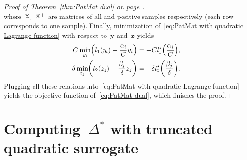 \begin{proof}[Proof of Theorem~\ref{thm:PatMat dual} on page~\pageref{thm:PatMat dual}]
\begin{equation*}
  \end{equation*}
  where~$\mathbb{X},$~$\mathbb{X}^+$ are matrices of all and positive samples respectively (each row corresponds to one sample). Finally, minimization of~\eqref{eq:PatMat with quadratic Lagrange function} with respect to~$\bm{y}$ and~$\bm{z}$ yields
  \begin{alignat*}{2}
      C \min_{y_i} \Brac{l_1(y_i) - \frac{\alpha_i}{C} y_i}
      & = - C l_1^{\star} \Brac{\frac{\alpha_i}{C}}, \\
      \delta \min_{z_j} \Brac{l_2(z_j) - \frac{\beta_j}{\delta} z_j}
      & = - \delta l_2^{\star} \Brac{\frac{\beta_j}{\delta}}.
  \end{alignat*}
  Plugging all these relations into~\eqref{eq:PatMat with quadratic Lagrange function} yields the objective function of~\eqref{eq:PatMat dual}, which finishes the proof.
\end{proof}

\section{Computing~$\Delta^{*}$ with truncated quadratic surrogate}\label{sec:Computing Delta with truncated quadratic surrogate}

\subsection{\TopPushK}

